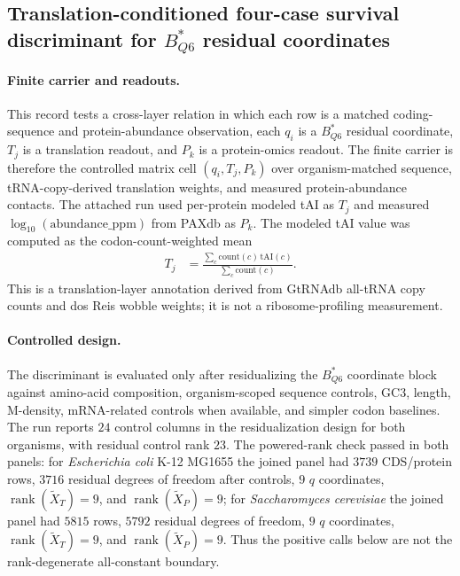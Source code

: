 \subsection{Translation-conditioned four-case survival discriminant for $B^*_{Q6}$ residual coordinates}
\label{sec:q6-translation-conditioned-four-case-survival-discriminant-cross-layer}

\paragraph{Finite carrier and readouts.}
This record tests a cross-layer relation in which each row is a matched coding-sequence and protein-abundance observation, each $q_i$ is a $B^*_{Q6}$ residual coordinate, $T_j$ is a translation readout, and $P_k$ is a protein-omics readout. The finite carrier is therefore the controlled matrix cell $(q_i,T_j,P_k)$ over organism-matched sequence, tRNA-copy-derived translation weights, and measured protein-abundance contacts. The attached run used per-protein modeled tAI as $T_j$ and measured $\log_{10}(\mathrm{abundance\_ppm})$ from PAXdb as $P_k$. The modeled tAI value was computed as the codon-count-weighted mean
$$
\begin{aligned}
T_j &= \frac{\sum_c \mathrm{count}(c)\,\mathrm{tAI}(c)}{\sum_c \mathrm{count}(c)} .
\end{aligned}
$$
This is a translation-layer annotation derived from GtRNAdb all-tRNA copy counts and dos Reis wobble weights; it is not a ribosome-profiling measurement.

\paragraph{Controlled design.}
The discriminant is evaluated only after residualizing the $B^*_{Q6}$ coordinate block against amino-acid composition, organism-scoped sequence controls, GC3, length, M-density, mRNA-related controls when available, and simpler codon baselines. The run reports $24$ control columns in the residualization design for both organisms, with residual control rank $23$. The powered-rank check passed in both panels: for \emph{Escherichia coli} K-12 MG1655 the joined panel had $3739$ CDS/protein rows, $3716$ residual degrees of freedom after controls, $9$ $q$ coordinates, $\operatorname{rank}(\widetilde X_T)=9$, and $\operatorname{rank}(\widetilde X_P)=9$; for \emph{Saccharomyces cerevisiae} the joined panel had $5815$ rows, $5792$ residual degrees of freedom, $9$ $q$ coordinates, $\operatorname{rank}(\widetilde X_T)=9$, and $\operatorname{rank}(\widetilde X_P)=9$. Thus the positive calls below are not the rank-degenerate all-constant boundary.

